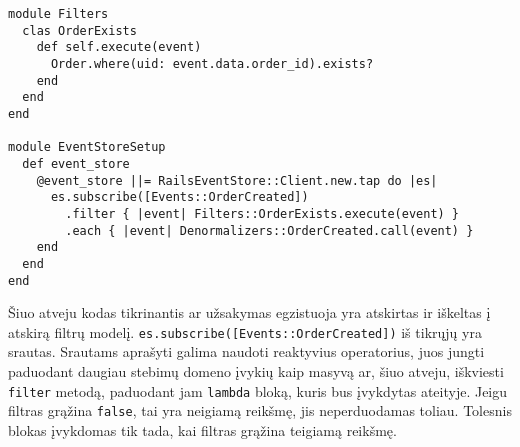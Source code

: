 \begin{lstlisting}
module Filters
  clas OrderExists
    def self.execute(event)
      Order.where(uid: event.data.order_id).exists?
    end
  end
end

module EventStoreSetup
  def event_store
    @event_store ||= RailsEventStore::Client.new.tap do |es|
      es.subscribe([Events::OrderCreated])
        .filter { |event| Filters::OrderExists.execute(event) }
        .each { |event| Denormalizers::OrderCreated.call(event) }
    end
  end
end
\end{lstlisting}

Šiuo atveju kodas tikrinantis ar užsakymas egzistuoja yra atskirtas ir iškeltas į atskirą filtrų modelį. \lstinline|es.subscribe([Events::OrderCreated])| iš tikrųjų yra srautas. Srautams aprašyti galima naudoti reaktyvius operatorius, juos jungti paduodant daugiau stebimų domeno įvykių kaip masyvą ar, šiuo atveju, iškviesti \lstinline|filter| metodą, paduodant jam \lstinline|lambda| bloką, kuris bus įvykdytas ateityje. Jeigu filtras grąžina \lstinline|false|, tai yra neigiamą reikšmę, jis neperduodamas toliau. Tolesnis blokas įvykdomas tik tada, kai filtras grąžina teigiamą reikšmę.






